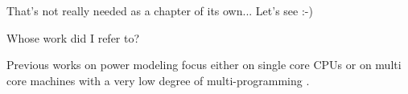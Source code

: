 
That's not really needed as a chapter of its own... Let's see :-)

Whose work did I refer to?

Previous works on power modeling focus either on single core CPUs
\cite{kellner03tempcontrol} or on multi core machines with a very low degree of
multi-programming \cite{Bertran2010,bertran2010decomposable}.
